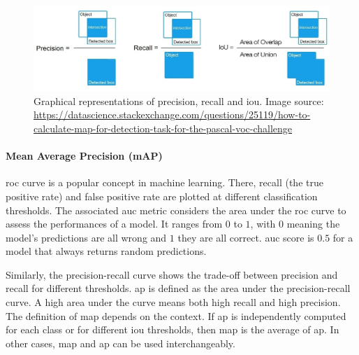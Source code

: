 \documentclass[%
    corpo=12pt,
    twoside,
    stile=classica,   
    tipotesi=magistrale,
    evenboxes,
    english,
	numerazioneromana,
]{toptesi}
\begin{document}
\begin{figure}[t]
	\centering
	\includegraphics[width=\linewidth]{imgs/precision_recall_iou.jpg}
	\caption[Graphical representations of precision, recall and \gls{iou}]{Graphical representations of precision, recall and \gls{iou}. Image source: \url{https://datascience.stackexchange.com/questions/25119/how-to-calculate-map-for-detection-task-for-the-pascal-voc-challenge}}
	\label{fig:iou}
\end{figure}

\paragraph{Mean Average Precision (mAP)}
\gls{roc} curve is a popular concept in machine learning. There, recall (the true positive rate) and false positive rate are plotted at different classification thresholds. The associated \gls{auc} metric considers the area under the \gls{roc} curve to assess the performances of a model\cite{roc}. It ranges from $ 0 $ to $ 1 $, with $ 0 $ meaning the model's predictions are all wrong and $ 1 $ they are all correct. \Gls{auc} score is $ 0.5 $ for a model that always returns random predictions.

\medskip
Similarly, the precision-recall curve shows the trade-off between precision and recall for different thresholds\cite{precrecall}. \gls{ap} is defined as the area under the precision-recall curve. A high area under the curve means both high recall and high precision. The definition of \gls{map} depends on the context. If \gls{ap} is independently computed for each class or for different \gls{iou} thresholds, then \gls{map} is the average of \gls{ap}. In other cases, \gls{map} and \gls{ap} can be used interchangeably.
\end{document}
